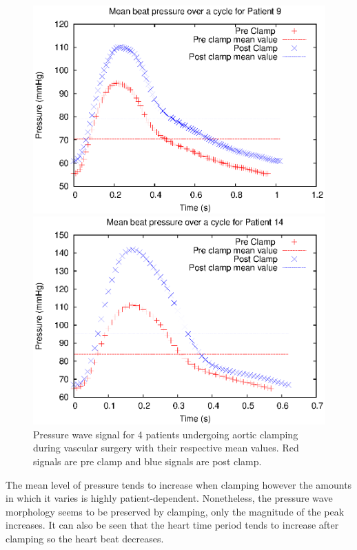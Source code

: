 \documentclass{config}
\begin{document}
\begin{figure}[H]
\begin{minipage}{0.48\textwidth}
\includegraphics[scale=0.66]{Figures/Patient9.eps}
\end{minipage}
\begin{minipage}{0.48\textwidth}
\includegraphics[scale=0.66]{Figures/Patient14.eps}
\end{minipage}
\caption{Pressure wave signal for 4 patients undergoing aortic clamping during vascular surgery with their respective mean values. Red signals are pre clamp and blue signals are post clamp.}
\label{expe}
\end{figure}

The mean level of pressure tends to increase when clamping however the amounts in which it varies is highly patient-dependent. Nonetheless, the pressure wave morphology seems to be preserved by clamping, only the magnitude of the peak increases. It can also be seen that the heart time period tends to increase after clamping so the heart beat decreases. 
\end{document}
